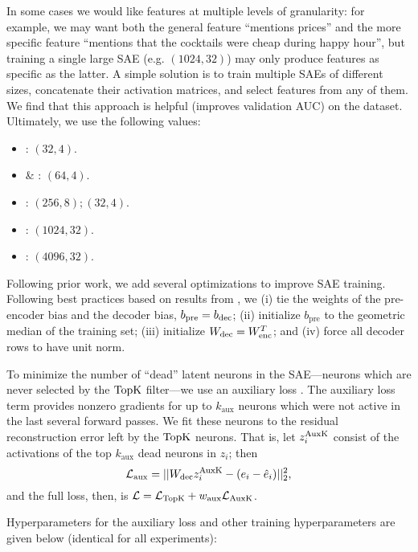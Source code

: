 In some cases we would like features at multiple levels of granularity: for example, we may want both the general feature ``mentions prices'' and the more specific feature ``mentions that the cocktails were cheap during happy hour'', but training a single large SAE (e.g. $(1024, 32)$) may only produce features as specific as the latter. 
A simple solution is to train multiple SAEs of different sizes, concatenate their activation matrices, and select features from any of them. 
We find that this approach is helpful (improves validation AUC) on the \headlines dataset. 
Ultimately, we use the following values:
 
\begin{itemize}
    \item {}: $(32, 4)$.
    \item {} \& \bills: $(64, 4)$.
    \item \headlines: $(256, 8); (32, 4)$.
    \item \yelp: $(1024, 32)$.
    \item \congress: $(4096, 32)$.
\end{itemize}

Following prior work, we add several optimizations to improve SAE training. Following best practices based on results from \citet{bricken2023towards}, we (i) tie the weights of the pre-encoder bias and the decoder bias, $b_{\mathrm{pre}} = b_{\operatorname{dec}}$; (ii) initialize $b_{\mathrm{pre}}$ to the geometric median of the training set; (iii) initialize $W_{\operatorname{dec}} = W_{\operatorname{enc}}^T$; and (iv) force all decoder rows to have unit norm. 

To minimize the number of ``dead'' latent neurons in the SAE—neurons which are never selected by the $\operatorname{TopK}$ filter—we use an auxiliary loss \citep{gao_scaling_2024, oneill_disentangling_2024}. 
The auxiliary loss term provides nonzero gradients for up to $k_{\text{aux}}$ neurons which were not active in the last several forward passes.
We fit these neurons to the residual reconstruction error left by the $\operatorname{TopK}$ neurons. 
That is, let $z_i^{\operatorname{AuxK}}$ consist of the activations of the top $k_{\text{aux}}$ dead neurons in $z_i$; then
$$\mathcal{L}_{\text{aux}} = ||W_{\operatorname{dec}} z_i^{\operatorname{AuxK}} - (e_i - \hat{e}_i)||^2_2,$$
and the full loss, then, is $\mathcal{L} = \mathcal{L}_{\operatorname{TopK}} + w_{\text{aux}}\mathcal{L}_{\operatorname{AuxK}}$. 

Hyperparameters for the auxiliary loss and other training hyperparameters are given below (identical for all experiments):

